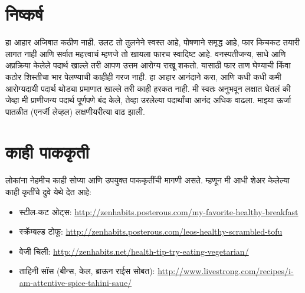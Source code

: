 \section*{निष्कर्ष}
हा आहार अजिबात कठीण नाही. उलट तो तुलनेने स्वस्त आहे, पोषणाने समृद्ध आहे, फार किचकट तयारी लागत नाही आणि सर्वात महत्त्वाचं म्हणजे तो खायला फारच स्वादिष्ट आहे.
वनस्पतीजन्य, साधे आणि अप्रक्रिया केलेले पदार्थ खाल्ले तरी आपण उत्तम आरोग्य राखू शकतो. यासाठी फार ताण घेण्याची किंवा कठोर शिस्तीचा भार पेलण्याची काहीही गरज नाही. हा आहार आनंदाने करा, आणि कधी कधी कमी आरोग्यदायी पदार्थ थोड्या प्रमाणात खाल्ले तरी काही हरकत नाही.
मी स्वतः अनुभवून लक्षात घेतलं की जेव्हा मी प्राणीजन्य पदार्थ पूर्णपणे बंद केले, तेव्हा उरलेल्या पदार्थांचा आनंद अधिक वाढला. माझ्या ऊर्जा पातळीत (एनर्जी लेव्हल) लक्षणीयरीत्या वाढ झाली.
\section*{काही पाककृती}
लोकांना नेहमीच काही सोप्या आणि उपयुक्त पाककृतींची मागणी असते. म्हणून मी आधी शेअर केलेल्या काही कृतींचे दुवे येथे देत आहे:
\begin{itemize}
 \item स्टील-कट ओट्स: \url{http://zenhabits.posterous.com/my-favorite-healthy-breakfast}
 \item स्क्रॅम्बल्ड टोफू: \url{http://zenhabits.posterous.com/leos-healthy-scrambled-tofu}
 \item वेजी चिली: \url{http://zenhabits.net/health-tip-try-eating-vegetarian/}
 \item ताहिनी सॉस (बीन्स, केल, ब्राऊन राईस सोबत): \url{http://www.livestrong.com/recipes/i-am-attentive-spice-tahini-saue/}
 \end{itemize}
